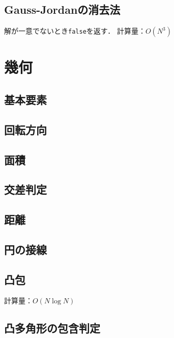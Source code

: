 \documentclass[landscape,twocolumn,9pt]{jsarticle}
\begin{document}
\subsection{Gauss-Jordanの消去法}
解が一意でないとき\texttt{false}を返す．
計算量：$O(N^3)$


\section{幾何}%
\subsection{基本要素}


\subsection{回転方向}


\subsection{面積}


\subsection{交差判定}


\subsection{距離}


\subsection{円の接線}


\subsection{凸包}
計算量：$O(N\log N)$


\subsection{凸多角形の包含判定}

\end{document}
